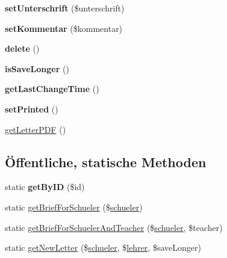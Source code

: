 \begin{DoxyCompactItemize}
\mbox{\label{class_schueler_brief_a7e1905d7326b30bad4fa0707758347cd}} 
{\bfseries set\+Unterschrift} (\$unterschrift)
\item 
\mbox{\label{class_schueler_brief_a3c59a19926662cf5230fc59075998acc}} 
{\bfseries set\+Kommentar} (\$kommentar)
\item 
\mbox{\label{class_schueler_brief_a0ddd89c55d90a3520a5a3fb10bb6ebbf}} 
{\bfseries delete} ()
\item 
\mbox{\label{class_schueler_brief_a3f3f9174a15097280266a6a04cee2760}} 
{\bfseries is\+Save\+Longer} ()
\item 
\mbox{\label{class_schueler_brief_a17efdcce73c8ae3c4e259a4afb36d341}} 
{\bfseries get\+Last\+Change\+Time} ()
\item 
\mbox{\label{class_schueler_brief_a106920bda6c95e7e419620c749912927}} 
{\bfseries set\+Printed} ()
\item 
\mbox{\hyperlink{class_schueler_brief_abc1ad0f0c3a528ddaa4542f6f0292688}{get\+Letter\+P\+DF}} ()
\end{DoxyCompactItemize}
\subsection*{Öffentliche, statische Methoden}
\begin{DoxyCompactItemize}
\item 
\mbox{\label{class_schueler_brief_a23113986f6753162b7edea91f6e451ed}} 
static {\bfseries get\+By\+ID} (\$id)
\item 
static \mbox{\hyperlink{class_schueler_brief_a125afeaeb4a83d3e47cea31d26d41b95}{get\+Brief\+For\+Schueler}} (\$\mbox{\hyperlink{classschueler}{schueler}})
\item 
static \mbox{\hyperlink{class_schueler_brief_aaba8756e9369287405693148bb1616cd}{get\+Brief\+For\+Schueler\+And\+Teacher}} (\$\mbox{\hyperlink{classschueler}{schueler}}, \$teacher)
\item 
static \mbox{\hyperlink{class_schueler_brief_af062332bd7a25794d932190708d196a8}{get\+New\+Letter}} (\$\mbox{\hyperlink{classschueler}{schueler}}, \$\mbox{\hyperlink{classlehrer}{lehrer}}, \$save\+Longer)
\end{DoxyCompactItemize}


